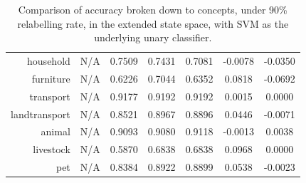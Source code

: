 \documentclass[11pt,a4paper]{book}
\begin{document}
\begin{table}[htbp]
\begin{tabular}{r|c|c|c|c|c|c}
household     & N/A    & 0.7509 & 0.7431 & 0.7081 & -0.0078 & -0.0350\\
furniture     & N/A    & 0.6226 & 0.7044 & 0.6352 & 0.0818 & -0.0692\\
transport     & N/A    & 0.9177 & 0.9192 & 0.9192 & 0.0015 & 0.0000\\
landtransport & N/A    & 0.8521 & 0.8967 & 0.8896 & 0.0446 & -0.0071\\
animal        & N/A    & 0.9093 & 0.9080 & 0.9118 & -0.0013 & 0.0038\\
livestock     & N/A    & 0.5870 & 0.6838 & 0.6838 & 0.0968 & 0.0000\\
pet           & N/A    & 0.8384 & 0.8922 & 0.8899 & 0.0538 & -0.0023
\end{tabular}
\caption{Comparison of accuracy broken down to concepts, under 90\% relabelling rate, in the extended state space, with SVM as the underlying unary classifier.}
\label{tab:svm90acc}
\end{table}
\end{document}
